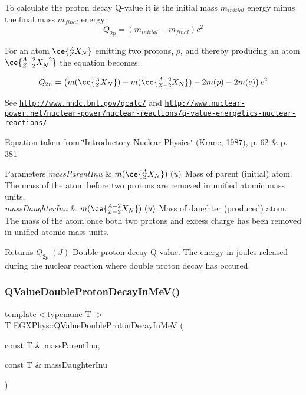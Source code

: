 To calculate the proton decay Q-\/value it is the initial mass $m_{initial}$ energy minus the final mass $m_{final}$ energy\+: \[Q_{2p} = \left ( m_{initial}-m_{final}\right ) c^2\]

For an atom $\ce{ ^{A}_{Z}X_{N} }$ emitting two protons, $p$, and thereby producing an atom $\ce{ ^{A-2}_{Z-2}X^{-2}_{N} }$ the equation becomes\+:

\[Q_{2n} = \left ( m(\ce{ ^{A}_{Z}X_{N} }) - m(\ce{ ^{A-2}_{Z-2}X_{N} }) - 2m(p) - 2m(e)\right ) c^2\]

See \href{http://www.nndc.bnl.gov/qcalc/}{\tt http\+://www.\+nndc.\+bnl.\+gov/qcalc/} and \href{http://www.nuclear-power.net/nuclear-power/nuclear-reactions/q-value-energetics-nuclear-reactions/}{\tt http\+://www.\+nuclear-\/power.\+net/nuclear-\/power/nuclear-\/reactions/q-\/value-\/energetics-\/nuclear-\/reactions/}

Equation taken from \char`\"{}\+Introductory Nuclear Physics\char`\"{} (Krane, 1987), p. 62 \& p. 381


\begin{DoxyParams}{Parameters}
{\em mass\+Parent\+Inu} & $m(\ce{ ^{A}_{Z}X_{N} })\ (u)$ Mass of parent (initial) atom. The mass of the atom before two protons are removed in unified atomic mass units. \\
\hline
{\em mass\+Daughter\+Inu} & $m(\ce{ ^{A-2}_{Z-2}X_{N} })\ (u)$ Mass of daughter (produced) atom. The mass of the atom once both two protons and excess charge has been removed in unified atomic mass units. \\
\hline
\end{DoxyParams}
\begin{DoxyReturn}{Returns}
$Q_{2p}\ (J)$ Double proton decay Q-\/value. The energy in joules released during the nuclear reaction where double proton decay has occured. 
\end{DoxyReturn}
\mbox{\label{group___e_g_x_phys-_q_value_ga4a57c8901e92918f08bee52493b81c59}} 
\subsubsection{\texorpdfstring{Q\+Value\+Double\+Proton\+Decay\+In\+Me\+V()}{QValueDoubleProtonDecayInMeV()}}
{\footnotesize\ttfamily template$<$typename T $>$ \\
T E\+G\+X\+Phys\+::\+Q\+Value\+Double\+Proton\+Decay\+In\+MeV (\begin{DoxyParamCaption}\item[{const T \&}]{mass\+Parent\+Inu,  }\item[{const T \&}]{mass\+Daughter\+Inu }\end{DoxyParamCaption})}



